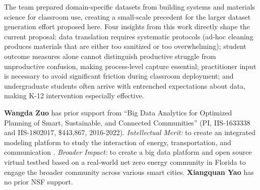 \documentclass[11pt]{article}
\begin{document}
The team prepared domain-specific datasets from building systems and materials science for classroom use, creating a small-scale precedent for the larger dataset generation effort proposed here.
Four insights from this work directly shape the current proposal:
data translation requires systematic protocols (ad-hoc cleaning produces materials that are either too sanitized or too overwhelming);
student outcome measures alone cannot distinguish productive struggle from unproductive confusion, making process-level capture essential;
practitioner input is necessary to avoid significant friction during classroom deployment;
and undergraduate students often arrive with entrenched expectations about data, making K-12 intervention especially effective.

\textbf{Wangda Zuo} has prior support from ``Big Data Analytics for Optimized Planning of Smart, Sustainable, and Connected Communities'' (PI, IIS-1633338 and IIS-1802017, \$443,867, 2016-2022). \textit{Intellectual Merit:} to create an integrated modeling platform to study the interaction of energy, transportation, and communication \cite{tian2017coupling,he2016virtual, tian2017coupled, tian2018building, tian2018optimization, ye2018creation, zhou2018modelling, he2016towards, sevilla2018low, zhang2020predictive, lu2019open, anbarasu2024exploring}. 
\textit{Broader Impact:} to create a big data platform and open source virtual testbed based on a real-world net zero energy community in Florida to engage the broader community across various smart cities.
\textbf{Xiangquan Yao} has no prior NSF support.
\end{document}
